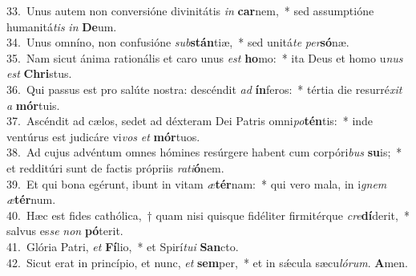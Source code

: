 {33.~}Unus autem non conversióne divinitátis \textit{in} \textbf{car}nem,~* sed assumptióne humanitá\textit{tis} \textit{in} \textbf{De}um.\\
{34.~}Unus omníno, non confusióne \textit{sub}\textbf{stán}tiæ,~* sed unitá\textit{te} \textit{per}\textbf{só}næ.\\
{35.~}Nam sicut ánima rationális et caro unus \textit{est} \textbf{ho}mo:~* ita Deus et homo u\textit{nus} \textit{est} \textbf{Chri}stus.\\
{36.~}Qui passus est pro salúte nostra: descéndit \textit{ad} \textbf{ín}feros:~* tértia die resurré\textit{xit} \textit{a} \textbf{mór}tuis.\\
{37.~}Ascéndit ad cælos, sedet ad déxteram Dei Patris omni\textit{po}\textbf{tén}tis:~* inde ventúrus est judicáre vi\textit{vos} \textit{et} \textbf{mór}tuos.\\
{38.~}Ad cujus advéntum omnes hómines resúrgere habent cum corpóri\textit{bus} \textbf{su}is;~* et redditúri sunt de factis própriis \textit{ra}\textit{ti}\textbf{ó}nem.\\
{39.~}Et qui bona egérunt, ibunt in vitam \textit{æ}\textbf{tér}nam:~* qui vero mala, in i\textit{gnem} \textit{æ}\textbf{tér}num.\\
{40.~}Hæc est fides cathólica,~† quam nisi quisque fidéliter firmitérque \textit{cre}\textbf{dí}derit,~* salvus es\textit{se} \textit{non} \textbf{pó}terit.\\
{41.~}Glória Patri, \textit{et} \textbf{Fí}lio,~* et Spirí\textit{tu}\textit{i} \textbf{San}cto.\\
{42.~}Sicut erat in princípio, et nunc, \textit{et} \textbf{sem}per,~* et in sǽcula sæcu\textit{ló}\textit{rum}. \textbf{A}men.\\

